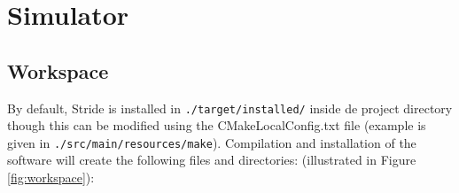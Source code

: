 \chapter{Simulator}
\label{chap:simulator}


\section{Workspace}

By default, Stride is installed in \texttt{./target/installed/} inside de project directory though this can be modified using the CMakeLocalConfig.txt file (example is given in \texttt{./src/main/resources/make}). 
Compilation and installation of the software will create the following files and directories: (illustrated in Figure \ref{fig:workspace}):

